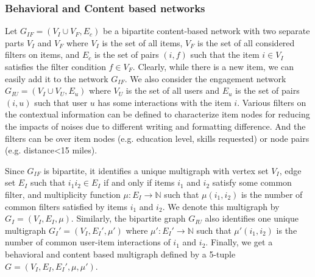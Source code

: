 \documentclass[manuscript,screen,review]{acmart}
\begin{document}
\subsubsection{Behavioral and Content based networks}
Let $G_{IF}=(V_I\cup V_F,E_c)$ be a bipartite content-based network with two separate parts $V_I$ and $V_F$ where $V_I$ is the set of all items, $V_F$ is the set of all considered filters on items, and $E_c$ is the set of pairs $(i,f)$ such that the item $i\in V_I$ satisfies the filter condition $f\in V_F$. Clearly, while there is a new item, we can easily add it to the network $G_{IF}$. We also consider the engagement network $G_{IU}=(V_I\cup V_U,E_u)$ where $V_U$ is the set of all users and $E_u$ is the set of pairs $(i,u)$ such that user $u$ has some interactions with the item $i$. Various filters on the contextual information can be defined to characterize item nodes for reducing the impacts of noises due to different writing and formatting difference. And the filters can be over item nodes (e.g. education level, skills requested) or node pairs (e.g. distance<15 miles).

Since $G_{IF}$ is bipartite, it identifies a unique multigraph with vertex set $V_I$, edge set $E_I$ such that $i_1i_2\in E_I$ if and only if items $i_1$ and $i_2$ satisfy some common filter, and multiplicity function $\mu: E_I\to \mathbb{N}$ such that $\mu(i_1,i_2)$ is the number of common filters satisfied by items $i_1$ and $i_2$. We denote this multigraph by $G_I=(V_I,E_I,\mu)$. Similarly, the bipartite graph $G_{IU}$ also identifies one unique multigraph $G_I'=(V_I,E_I',\mu')$ where $\mu': E_I'\to\mathbb{N}$ such that $\mu'(i_1,i_2)$ is the number of common user-item interactions of $i_1$ and $i_2$. Finally, we get a behavioral and content based multigraph defined by a 5-tuple $G=(V_I,E_I,E_I',\mu,\mu')$.
\end{document}
